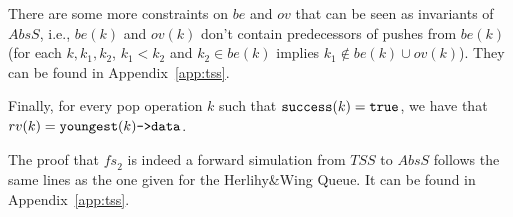 There are some more constraints on $be$ and $ov$ that can be seen as invariants of $AbsS$, i.e., $be(k)$ and $ov(k)$ don't contain predecessors of pushes from $be(k)$ (for each $k, k_1, k_2$, $k_1 < k_2$ and $k_2 \in be(k)$ implies $k_1\not\in be(k)\cup ov(k)$). They can be found in Appendix~\ref{app:tss}.

Finally, for every pop operation $k$ such that ${\tt success}(k)={\tt true}$, we have that $rv(k)={\tt youngest}(k)\text{\tt->data}$.

The proof that $\mathit{fs}_2$ is indeed a forward simulation from $\mathit{TSS}$ to $AbsS$ follows the same lines as the one given for the Herlihy\&Wing Queue. It can be found in Appendix~\ref{app:tss}.
